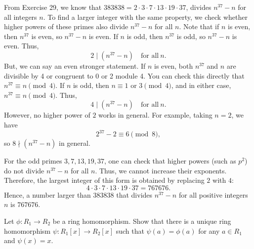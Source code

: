 \begin{solution}
  From Exercise 29, we know that $383838 = 2 \cdot 3 \cdot 7 \cdot 13 \cdot 19 \cdot 37$, divides $n^{37} - n$ for all integers $n$. To find a larger integer with the same property, we check whether higher powers of these primes also divide $n^{37} - n$ for all $n$. Note that if $n$ is even, then $n^{37}$ is even, so $n^{37} - n$ is even. If $n$ is odd, then $n^{37}$ is odd, so $n^{37} - n$ is even. Thus,
  \[%
    2 \mid (n^{37} - n) \quad \text{for all}~n
  .\]%
  But, we can say an even stronger statement. If $n$ is even, both $n^{37}$ and $n$ are divisible by 4 or congruent to 0 or 2 module 4. You can check this directly that $n^{37} \equiv n \pmod{4}$. If $n$ is odd, then $n\equiv 1$ or $3 \pmod{4}$, and in either case, $n^{37} \equiv n \pmod{4}$. Thus,
  \[%
    4 \mid (n^{37} - n) \quad \text{for all}~n
  .\]%
  However, no higher power of $2$ works in general. For example, taking $n = 2$, we have
  \[%
    2^{37} - 2 \equiv 6 \pmod{8}
  ,\]%
  so $8 \nmid (n^{37} - n)$ in general.

  For the odd primes $3,7,13,19,37$, one can check that higher powers (such as $p^2$) do not divide $n^{37} - n$ for all $n$. Thus, we cannot increase their exponents. Therefore, the largest integer of this form is obtained by replacing $2$ with $4$:
  \[%
    4 \cdot 3 \cdot 7 \cdot 13 \cdot 19 \cdot 37 = 767676
  .\]%
  Hence, a number larger than $383838$ that divides $n^{37} - n$ for all positive integers $n$ is $767676$.
\end{solution}

\begin{problem}[27.32]
  Let $\phi : R_1 \to R_2$ be a ring homomorphism. Show that there is a unique ring homomorphism $\psi : R_1[x] \to R_2[x]$ such that $\psi(a) = \phi(a)$ for any $a \in R_1$ and $\psi(x) = x$.
\end{problem}

